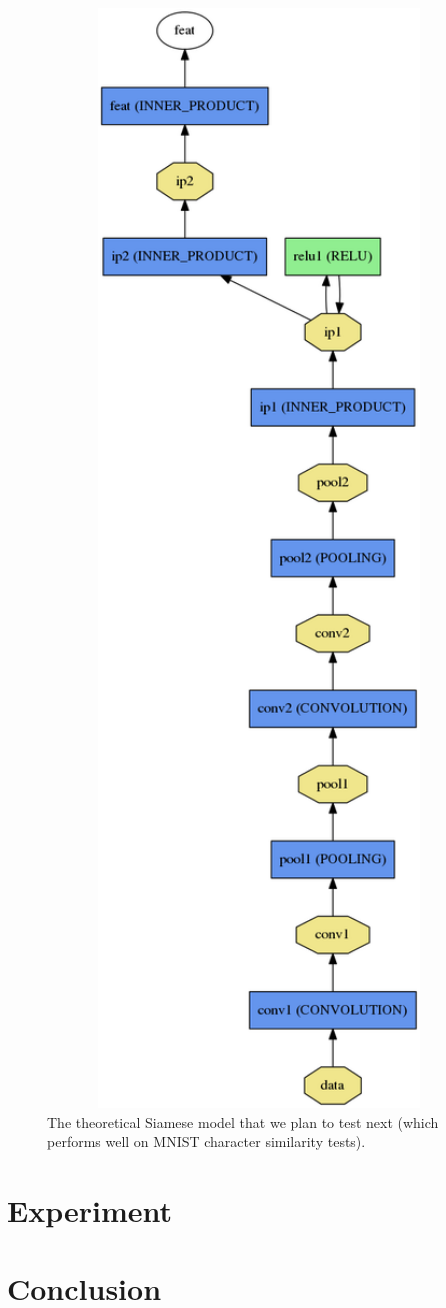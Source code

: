 \documentclass[12pt,twoside]{article}
\begin{document}
\begin{figure}[h]
\centering
\setlength{\abovecaptionskip}{-2.25in}
\includegraphics[angle=-90,origin=c,width=1.0\textwidth]{figures/siamese_model.png}
\caption{The theoretical Siamese model that we plan to test next (which performs well on MNIST character similarity tests).}
\label{fig:siamese_model}
\end{figure}

\section{Experiment}

\section{Conclusion}



\pagebreak

\printbibliography
\end{document}
